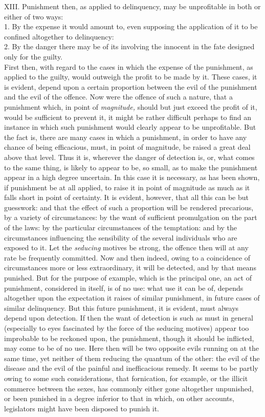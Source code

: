 \documentclass[12pt]{report}
\begin{document}
XIII. Punishment then, as applied to delinquency, may be unprofitable in
both or either of two ways:\\
1. By the expense it would amount to, even supposing the application of
it to be confined altogether to delinquency:\\
2. By the danger there may be of its involving the innocent in the fate
designed only for the guilty.\\
First then, with regard to the cases in which the expense of the
punishment, as applied to the guilty, would outweigh the profit to be
made by it. These cases, it is evident, depend upon a certain proportion
between the evil of the punishment and the evil of the offence. Now were
the offence of such a nature, that a punishment which, in point of
\emph{magnitude,} should but just exceed the profit of it, would be
sufficient to prevent it, it might be rather difficult perhaps to find
an instance in which such punishment would clearly appear to be
unprofitable. But the fact is, there are many cases in which a
punishment, in order to have any chance of being efficacious, must, in
point of magnitude, be raised a great deal above that level. Thus it is,
wherever the danger of detection is, or, what comes to the same thing,
is likely to appear to be, so small, as to make the punishment appear in
a high degree uncertain. In this case it is necessary, as has been
shown, if punishment be at all applied, to raise it in point of
magnitude as much as it falls short in point of certainty. It is
evident, however, that all this can be but guesswork: and that the
effect of such a proportion will be rendered precarious, by a variety of
circumstances: by the want of sufficient promulgation on the part of the
laws: by the particular circumstances of the temptation: and by the
circumstances influencing the sensibility of the several individuals who
are exposed to it. Let the \emph{seducing} motives be strong, the
offence then will at any rate be frequently committed. Now and then
indeed, owing to a coincidence of circumstances more or less
extraordinary, it will be detected, and by that means punished. But for
the purpose of example, which is the principal one, an act of
punishment, considered in itself, is of no use: what use it can be of,
depends altogether upon the expectation it raises of similar punishment,
in future cases of similar delinquency. But this future punishment, it
is evident, must always depend upon detection. If then the want of
detection is such as must in general (especially to eyes fascinated by
the force of the seducing motives) appear too improbable to be reckoned
upon, the punishment, though it should be inflicted, may come to be of
no use. Here then will be two opposite evils running on at the same
time, yet neither of them reducing the quantum of the other: the evil of
the disease and the evil of the painful and inefficacious remedy. It
seems to be partly owing to some such considerations, that fornication,
for example, or the illicit commerce between the sexes, has commonly
either gone altogether unpunished, or been punished in a degree inferior
to that in which, on other accounts, legislators might have been
disposed to punish it.
\end{document}

